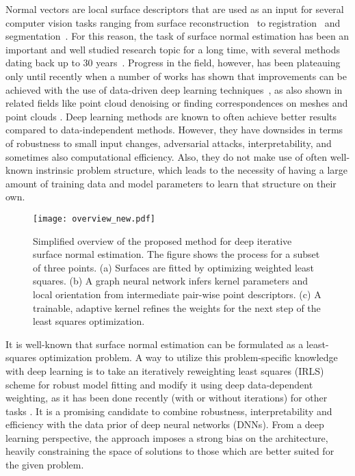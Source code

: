 \documentclass[10pt,twocolumn,letterpaper]{article}
\begin{document}
Normal vectors are local surface descriptors that are used as an input for several 
computer vision tasks ranging from surface reconstruction~\cite{Kazhdan:2006} to 
registration~\cite{Pomerleau:2015} and segmentation~\cite{Grilli:2017}.
For this reason, the task of surface normal estimation has been an important
and well studied research topic for a long time, with 
several methods dating back up to 30 years~\cite{Hoppe:1992}.
Progress in the field, however, has been plateauing only until recently 
when a number of works has shown that improvements can be achieved
with the use of data-driven deep learning \mbox{techniques \cite{Ben-Shabat:2018, Boulch:2016, Guerrero:2018}},
as also shown in related fields like point cloud denoising \cite{Rakotosaona:2019} or finding 
correspondences on meshes and point clouds \cite{Deng:2018b, Fey:2018, Masci:2015, Monti:2017}.
Deep learning methods are known to often achieve better results compared to data-independent methods. However, they have downsides in terms of robustness to small input changes, adversarial attacks, interpretability, and sometimes also computational efficiency. Also, they do not make use of often well-known instrinsic problem structure, which leads to the necessity of having a large amount of training data and model parameters to learn that structure on their own.

 \begin{figure}[t]
\centering
  \texttt{[image: overview\_new.pdf]}
  \caption{Simplified overview of the proposed method for deep iterative surface normal estimation. The figure shows the process for a subset of three points. (a) Surfaces are fitted by optimizing weighted least squares. (b) A graph neural network infers kernel parameters and local orientation from intermediate pair-wise point descriptors. (c) A trainable, adaptive kernel refines the weights for the next step of the least squares optimization.}
  \label{fig:overview}
\vspace{-0.3cm}
\end{figure}

It is well-known that surface normal estimation can be formulated as a least-squares optimization problem.
A way to utilize this problem-specific knowledge with deep learning is to take an iteratively reweighting least squares (IRLS) scheme \cite{Holland:1977} for robust model fitting and modify it
using deep data-dependent weighting, as it has been done recently (with or without iterations) for other tasks \cite{Huang:2019, Ranftl:2018,Suwajanakorn:2018, Wang:2019}. It is a promising candidate to combine robustness, interpretability and efficiency with the data prior of deep neural networks (DNNs). From a deep learning perspective, the approach imposes a strong bias on the architecture, heavily constraining the space of solutions to those which are better suited for the given problem.
\end{document}
